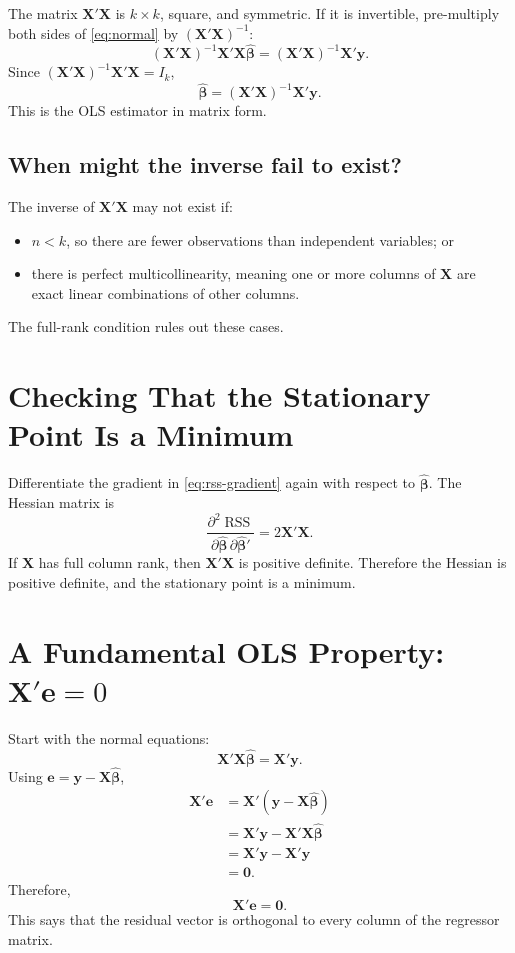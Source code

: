 \documentclass[11pt]{article}
\newcommand{\bhat}{\hat{\boldsymbol{\beta}}}
\newcommand{\ee}{\mathbf{e}}
\newcommand{\XX}{\mathbf{X}}
\newcommand{\yy}{\mathbf{y}}
\newcommand{\RSS}{\operatorname{RSS}}
\begin{document}
The matrix $\XX'\XX$ is $k\times k$, square, and symmetric. If it is invertible, pre-multiply both sides of \eqref{eq:normal} by $(\XX'\XX)^{-1}$:
\[
(\XX'\XX)^{-1}\XX'\XX\bhat=(\XX'\XX)^{-1}\XX'\yy.
\]
Since $(\XX'\XX)^{-1}\XX'\XX=I_k$,
\begin{equation}
    \boxed{\bhat=(\XX'\XX)^{-1}\XX'\yy.}
    \label{eq:ols-estimator}
\end{equation}
This is the OLS estimator in matrix form.

\subsection{When might the inverse fail to exist?}
The inverse of $\XX'\XX$ may not exist if:
\begin{itemize}
    \item $n<k$, so there are fewer observations than independent variables; or
    \item there is perfect multicollinearity, meaning one or more columns of $\XX$ are exact linear combinations of other columns.
\end{itemize}
The full-rank condition rules out these cases.

\section{Checking That the Stationary Point Is a Minimum}

Differentiate the gradient in \eqref{eq:rss-gradient} again with respect to $\bhat$. The Hessian matrix is
\[
\frac{\partial^2\RSS}{\partial\bhat\,\partial\bhat'}
=2\XX'\XX.
\]
If $\XX$ has full column rank, then $\XX'\XX$ is positive definite. Therefore the Hessian is positive definite, and the stationary point is a minimum.

\section{A Fundamental OLS Property: $\XX'\ee=0$}

Start with the normal equations:
\[
\XX'\XX\bhat=\XX'\yy.
\]
Using $\ee=\yy-\XX\bhat$,
\begin{align*}
\XX'\ee
&=\XX'(\yy-\XX\bhat)\\
&=\XX'\yy-\XX'\XX\bhat\\
&=\XX'\yy-\XX'\yy\\
&=\mathbf{0}.
\end{align*}
Therefore,
\begin{equation}
    \boxed{\XX'\ee=\mathbf{0}.}
    \label{eq:xte}
\end{equation}
This says that the residual vector is orthogonal to every column of the regressor matrix.
\end{document}

